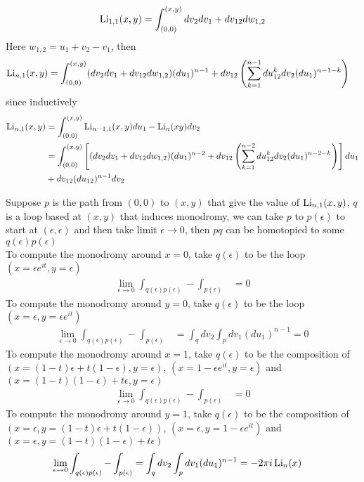 \documentclass[main]{subfiles}
\begin{document}
\[\operatorname{Li}_{1,1}(x,y)=\int_{(0,0)}^{(x,y)}dv_2dv_1+dv_{12}dw_{1,2}\]
Here $w_{1,2}=u_1+v_2-v_1$, then
\begin{align*}
\operatorname{Li}_{n,1}(x,y)&=\int_{(0,0)}^{(x,y)} (dv_2dv_1+dv_{12}dw_{1,2})(du_1)^{n-1} +dv_{12}\left(\sum_{k=1}^{n-1}du_{12}^kdv_2(du_1)^{n-1-k}\right)
\end{align*}
since inductively
\begin{align*}
\operatorname{Li}_{n,1}(x,y)&=\int_{(0,0)}^{(x,y)} \operatorname{Li}_{n-1,1}(x,y)du_1-\operatorname{Li}_n(xy)dv_2 \\
&=\int_{(0,0)}^{(x,y)} \left[(dv_2dv_1+dv_{12}dw_{1,2})(du_1)^{n-2} +dv_{12}\left(\sum_{k=1}^{n-2}du_{12}^kdv_2(du_1)^{n-2-k}\right)\right]du_1 \\
&+dv_{12}(du_{12})^{n-1}dv_2
\end{align*}

Suppose $p$ is the path from $(0,0)$ to $(x,y)$ that give the value of $\operatorname{Li}_{n,1}(x,y)$, $q$ is a loop based at $(x,y)$ that induces monodromy, we can take $p$ to $p(\epsilon)$ to start at $(\epsilon,\epsilon)$ and then take limit $\epsilon\to0$, then $pq$ can be homotopied to some $q(\epsilon)p(\epsilon)$ \\
To compute the monodromy around $x=0$, take $q(\epsilon)$ to be the loop $(x=\epsilon e^{it},y=\epsilon)$
\begin{align*}
\lim_{\epsilon\to0}\int_{q(\epsilon)p(\epsilon)}-\int_{p(\epsilon)}&=0
\end{align*}
To compute the monodromy around $y=0$, take $q(\epsilon)$ to be the loop $(x=\epsilon,y=\epsilon e^{it})$
\begin{align*}
\lim_{\epsilon\to0}\int_{q(\epsilon)p(\epsilon)}-\int_{p(\epsilon)}&=\int_qdv_2\int_pdv_1(du_1)^{n-1}=0
\end{align*}
To compute the monodromy around $x=1$, take $q(\epsilon)$ to be the composition of $(x=(1-t)\epsilon+t(1-\epsilon),y=\epsilon)$, $(x=1-\epsilon e^{it},y=\epsilon)$ and $(x=(1-t)(1-\epsilon)+t\epsilon,y=\epsilon)$
\begin{align*}
\lim_{\epsilon\to0}\int_{q(\epsilon)p(\epsilon)}-\int_{p(\epsilon)}&=0
\end{align*}
To compute the monodromy around $y=1$, take $q(\epsilon)$ to be the composition of $(x=\epsilon,y=(1-t)\epsilon+t(1-\epsilon))$, $(x=\epsilon,y=1-\epsilon e^{it})$ and $(x=\epsilon,y=(1-t)(1-\epsilon)+t\epsilon)$
\begin{align*}
\lim_{\epsilon\to0}\int_{q(\epsilon)p(\epsilon)}-\int_{p(\epsilon)}&=\int_qdv_2\int_pdv_1(du_1)^{n-1}=-2\pi i\operatorname{Li}_n(x)
\end{align*}
\end{document}
